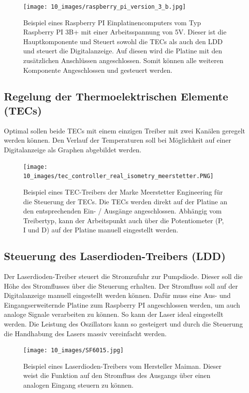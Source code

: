 \begin{figure}[H]
    \centering
    \texttt{[image: 10\_images/raspberry\_pi\_version\_3\_b.jpg]}
    \caption{Beispiel eines Raspberry PI Einplatinencomputers vom Typ Raspberry PI 3B+ mit einer Arbeitsspannung von 5V. Dieser ist die Hauptkomponente und Steuert sowohl die TECs als auch den LDD und steuert die Digitalanzeige. Auf diesen wird die Platine mit den zusätzlichen Anschlüssen angeschlossen. Somit können alle weiteren Komponente Angeschlossen und gesteuert werden.}
    \label{fig:raspberry_pi}
\end{figure}

\subsection{Regelung der Thermoelektrischen Elemente (TECs)}
Optimal sollen beide TECs mit einem einzigen Treiber mit zwei Kanälen geregelt werden können. Den Verlauf der Temperaturen soll bei Möglichkeit auf einer Digitalanzeige als Graphen abgebildet werden.

\begin{figure}[H]
    \centering
    \texttt{[image: 10\_images/tec\_controller\_real\_isometry\_meerstetter.PNG]}
    \caption{Beispiel eines TEC-Treibers der Marke Meerstetter Engineering für die Steuerung der TECs. Die TECs werden direkt auf der Platine an den entsprechenden Ein- / Ausgänge angeschlossen. Abhängig vom Treibertyp, kann der Arbeitspunkt auch über die Potentiometer (P, I und D) auf der Platine manuell eingestellt werden.}
    \label{fig:tec_controller_free}
\end{figure}

\subsection{Steuerung des Laserdioden-Treibers (LDD)}
Der Laserdioden-Treiber steuert die Stromzufuhr zur Pumpdiode. Dieser soll die Höhe des Stromflusses über die Steuerung erhalten. Der Stromfluss soll auf der Digitalanzeige manuell eingestellt werden können. Dafür muss eine Aus- und Eingangserweiternde Platine zum Raspberry PI angeschlossen werden, um auch analoge Signale verarbeiten zu können.
So kann der Laser ideal eingestellt werden. Die Leistung des Oszillators kann so gesteigert und durch die Steuerung die Handhabung des Lasers massiv vereinfacht werden.

\begin{figure}[H]
    \centering
    \texttt{[image: 10\_images/SF6015.jpg]}
    \caption{Beispiel eines Laserdioden-Treibers vom Hersteller Maiman. Dieser weist die Funktion auf den Stromfluss des Ausgangs über einen analogen Eingang steuern zu können.}
    \label{fig:ldd}
\end{figure}

